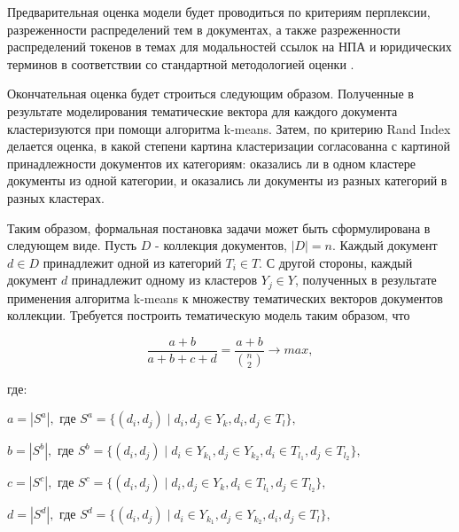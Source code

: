 \documentclass[12pt]{article}
\begin{document}

Предварительная оценка модели будет проводиться по критериям перплексии, разреженности распределений тем в документах, а также разреженности распределений токенов в темах для модальностей ссылок на НПА и юридических терминов в соответствии со стандартной методологией оценки \cite{vorontsov2015additive}. 

Окончательная оценка будет строиться следующим образом. Полученные в результате моделирования тематические вектора для каждого документа кластеризуются при помощи алгоритма k-means. Затем, по критерию Rand Index делается оценка, в какой степени картина кластеризации согласованна с картиной принадлежности документов их категориям:  оказались ли в одном кластере документы из одной категории, и оказались ли документы из разных категорий в разных кластерах.

Таким образом, формальная постановка задачи может быть сформулирована в следующем виде.
Пусть $D$ - коллекция документов, $|D|=n$. Каждый документ $d\in D$ принадлежит одной из категорий $T_{i}\in T$. С другой стороны, каждый документ $d$ принадлежит одному из кластеров $Y_{j}\in Y$, полученных в результате применения алгоритма k-means к множеству тематических векторов документов коллекции. Требуется построить тематическую модель таким образом, что


\begin{equation}
\frac{a+b}{a+b+c+d} = \frac{a+b}{{n \choose 2 }}\to max,
\end{equation}

где:

$a = |S^{a}|,$ где $S^{a} = \{ (d_{i}, d_{j}) \mid d_{i}, d_{j} \in Y_{k}, d_{i}, d_{j} \in T_{l}\},$

$b = |S^{b}|,$ где $S^{b} = \{ (d_{i}, d_{j}) \mid d_{i} \in Y_{k_{1}}, d_{j} \in Y_{k_{2}}, d_{i} \in T_{l_{1}}, d_{j} \in T_{l_{2}}\},$

$c = |S^{c}|,$ где $S^{c} = \{ (d_{i}, d_{j}) \mid d_{i}, d_{j} \in Y_{k}, d_{i} \in T_{l_{1}}, d_{j} \in T_{l_{2}}\},$

$d = |S^{d}|,$ где $S^{d} = \{ (d_{i}, d_{j}) \mid d_{i} \in Y_{k_{1}}, d_{j} \in Y_{k_{2}}, d_{i}, d_{j} \in T_{l}\},$
\end{document}
